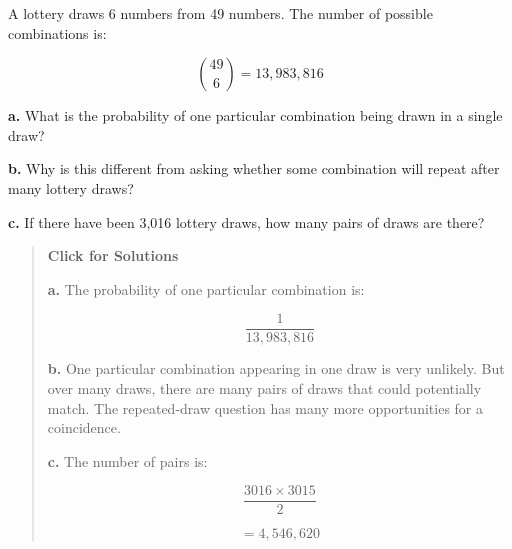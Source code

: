 \documentclass[
  letterpaper,
  DIV=11,
  numbers=noendperiod]{scrreprt}
\begin{document}
\begin{tcolorbox}[enhanced jigsaw, arc=.35mm, bottomrule=.15mm, bottomtitle=1mm, breakable, colback=white, colbacktitle=quarto-callout-note-color!10!white, colframe=quarto-callout-note-color-frame, coltitle=black, left=2mm, leftrule=.75mm, opacityback=0, opacitybacktitle=0.6, rightrule=.15mm, title=\textcolor{quarto-callout-note-color}{\faInfo}\hspace{0.5em}{Question 7}, titlerule=0mm, toprule=.15mm, toptitle=1mm]

A lottery draws 6 numbers from 49 numbers. The number of possible
combinations is:

\[
\binom{49}{6} = 13{,}983{,}816
\]

\textbf{a.} What is the probability of one particular combination being
drawn in a single draw?

\textbf{b.} Why is this different from asking whether some combination
will repeat after many lottery draws?

\textbf{c.} If there have been 3,016 lottery draws, how many pairs of
draws are there?

\begin{quote}
\textbf{Click for Solutions}

\textbf{a.} The probability of one particular combination is:

\[
\frac{1}{13{,}983{,}816}
\]

\textbf{b.} One particular combination appearing in one draw is very
unlikely. But over many draws, there are many pairs of draws that could
potentially match. The repeated-draw question has many more
opportunities for a coincidence.

\textbf{c.} The number of pairs is:

\[
\frac{3016\times 3015}{2}
\]

\[
= 4{,}546{,}620
\]
\end{quote}

\end{tcolorbox}
\end{document}
